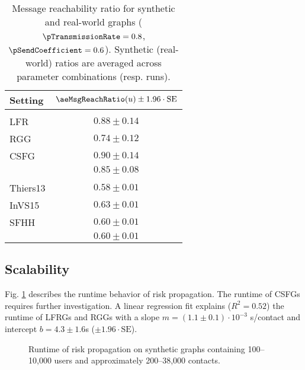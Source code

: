 \begin{table}[htbp]
	\centering
	\begin{tabular}{lc}
		\toprule
		\bfseries Setting & $\aeMsgReachRatio(u) \pm 1.96 \cdot \text{SE}$\\
		\midrule
		\rowgroup{\itshape Synthetic} \\
		LFR & $0.88 \pm 0.14$\\
		RGG & $0.74 \pm 0.12$\\
		CSFG & $0.90 \pm 0.14$\\
		& $\boldsymbol{0.85 \pm 0.08}$ \\
		\midrule
		\rowgroup{\itshape Real-world} \\
		Thiers13 & $0.58 \pm 0.01$\\
		InVS15 & $0.63 \pm 0.01$\\
		SFHH & $0.60 \pm 0.01$\\
		& $\boldsymbol{0.60 \pm 0.01}$ \\
		\bottomrule
	\end{tabular}
	\caption[Message reachability ratio for synthetic and real-world graphs]{Message reachability ratio for synthetic and real-world graphs ($\pTransmissionRate = 0.8$, $\pSendCoefficient = 0.6$). Synthetic (real-world) ratios are averaged across parameter combinations (resp. runs).}
	\label{tab:reachability}
\end{table}

\subsection{Scalability}

Fig. \ref{fig:runtime} describes the runtime behavior of risk propagation. The runtime of CSFGs requires further investigation. A linear regression fit explains ($R^2 = 0.52$) the runtime of LFRGs and RGGs with a slope $m = (1.1 \pm 0.1) \cdot 10^{-3}$ s/contact and intercept $b = 4.3 \pm 1.6$s ($\pm 1.96 \cdot \text{SE}$).

\begin{figure}[htbp]
	\centering
	\caption[Runtime of risk propagation]{Runtime of risk propagation on synthetic graphs containing 100--10,000 users and approximately 200--38,000 contacts.}
	\label{fig:runtime}
\end{figure}